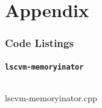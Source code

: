 \documentclass[12pt]{article}
\begin{document}
\makeatletter{}\makeatother
\pagebreak\part{Appendix}
\section{Code Listings}

	\subsection{\texttt{lscvm-memoryinator}}
		\vspace{\baselineskip}
		\begin{multipagecode}
			\inputminted[xleftmargin=0.075\textwidth,xrightmargin=0.075\textwidth,frame=leftline,framesep=4mm,framerule=0.4mm,
	linenos=true]{cpp}{../lscvm/lscvm-memoryinator.cpp}
			\caption{lscvm-memoryinator.cpp}
			\label{code:lscvm-memoryinator}
		\end{multipagecode}
\end{document}
